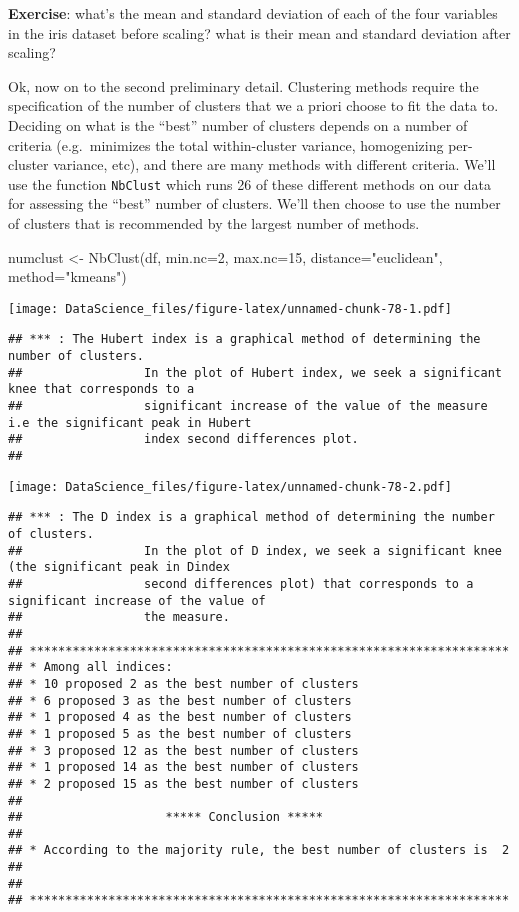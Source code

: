 \documentclass[
]{book}
\newenvironment{Shaded}{\begin{snugshade}}{\end{snugshade}}
\newcommand{\AttributeTok}[1]{\textcolor[rgb]{0.77,0.63,0.00}{#1}}
\newcommand{\DecValTok}[1]{\textcolor[rgb]{0.00,0.00,0.81}{#1}}
\newcommand{\FunctionTok}[1]{\textcolor[rgb]{0.00,0.00,0.00}{#1}}
\newcommand{\NormalTok}[1]{#1}
\newcommand{\OtherTok}[1]{\textcolor[rgb]{0.56,0.35,0.01}{#1}}
\newcommand{\StringTok}[1]{\textcolor[rgb]{0.31,0.60,0.02}{#1}}
\begin{document}
\textbf{Exercise}: what's the mean and standard deviation of each of the four variables in the iris dataset before scaling? what is their mean and standard deviation after scaling?

Ok, now on to the second preliminary detail. Clustering methods require the specification of the number of clusters that we a priori choose to fit the data to. Deciding on what is the ``best'' number of clusters depends on a number of criteria (e.g.~minimizes the total within-cluster variance, homogenizing per-cluster variance, etc), and there are many methods with different criteria. We'll use the function \texttt{NbClust} which runs 26 of these different methods on our data for assessing the ``best'' number of clusters. We'll then choose to use the number of clusters that is recommended by the largest number of methods.

\begin{Shaded}
\begin{Highlighting}[]
\NormalTok{numclust }\OtherTok{\textless{}{-}} \FunctionTok{NbClust}\NormalTok{(df, }\AttributeTok{min.nc=}\DecValTok{2}\NormalTok{, }\AttributeTok{max.nc=}\DecValTok{15}\NormalTok{, }\AttributeTok{distance=}\StringTok{"euclidean"}\NormalTok{, }\AttributeTok{method=}\StringTok{"kmeans"}\NormalTok{)}
\end{Highlighting}
\end{Shaded}

\texttt{[image: DataScience\_files/figure-latex/unnamed-chunk-78-1.pdf]}

\begin{verbatim}
## *** : The Hubert index is a graphical method of determining the number of clusters.
##                 In the plot of Hubert index, we seek a significant knee that corresponds to a 
##                 significant increase of the value of the measure i.e the significant peak in Hubert
##                 index second differences plot. 
## 
\end{verbatim}

\texttt{[image: DataScience\_files/figure-latex/unnamed-chunk-78-2.pdf]}

\begin{verbatim}
## *** : The D index is a graphical method of determining the number of clusters. 
##                 In the plot of D index, we seek a significant knee (the significant peak in Dindex
##                 second differences plot) that corresponds to a significant increase of the value of
##                 the measure. 
##  
## ******************************************************************* 
## * Among all indices:                                                
## * 10 proposed 2 as the best number of clusters 
## * 6 proposed 3 as the best number of clusters 
## * 1 proposed 4 as the best number of clusters 
## * 1 proposed 5 as the best number of clusters 
## * 3 proposed 12 as the best number of clusters 
## * 1 proposed 14 as the best number of clusters 
## * 2 proposed 15 as the best number of clusters 
## 
##                    ***** Conclusion *****                            
##  
## * According to the majority rule, the best number of clusters is  2 
##  
##  
## *******************************************************************
\end{verbatim}
\end{document}
